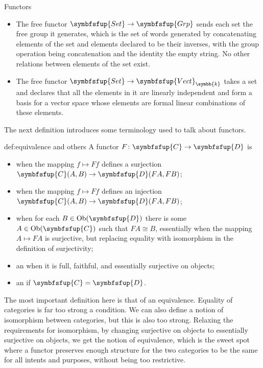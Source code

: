 \documentclass[fleqn]{NotesClass}
\makeatletter
\newcommand{\cat}[1]{\symbfsfup{#1}}
\newcommand{\c@egory}[1]{\symbfsfup{#1}}
\newcommand{\Set}{\c@egory{Set}}
\renewcommand{\field}{\symbb{k}}
\newcommand{\Vect}[1][\field]{{\c@egory{Vect}_{#1}}}
\newcommand{\Grp}{\c@egory{Grp}}
\DeclareMathOperator{\Ob}{Ob}
\newcommand{\isomorphic}{\cong}
\makeatother
\begin{document}
\begin{exm}{Functors}{}
\begin{itemize}
            \begin{itemize}
                \item The free functor \(\Set \to \Grp\) sends each set the free group it generates, which is the set of words generated by concatenating elements of the set and elements declared to be their inverses, with the group operation being concatenation and the identity the empty string.
                No other relations between elements of the set exist.
                \item The free functor \(\Set \to \Vect\) takes a set and declares that all the elements in it are linearly independent and form a basis for a vector space whose elements are formal linear combinations of these elements.
            \end{itemize}
        \end{itemize}
    \end{exm}
    
    The next definition introduces some terminology used to talk about functors.
    
    \begin{dfn}{}{def:equivalence and others}
        A functor \(F \colon \cat{C} \to \cat{D}\) is
        \begin{itemize}
            \item {} when the mapping \(f \mapsto Ff\) defines a surjection \(\cat{C}(A, B) \to \cat{D}(FA, FB)\);
            \item {} when the mapping \(f \mapsto Ff\) defines an injection \(\cat{C}(A, B) \to \cat{D}(FA, FB)\);
            \item {} when for each \(B \in \Ob(\cat{D})\) there is some \(A \in \Ob(\cat{C})\) such that \(FA \isomorphic B\), essentially when the mapping \(A \mapsto FA\) is surjective, but replacing equality with isomorphism in the definition of surjectivity;
            \item an  when it is full, faithful, and essentially surjective on objects;
            \item an  if \(\cat{C} = \cat{D}\).
        \end{itemize}
    \end{dfn}
    
    The most important definition here is that of an equivalence.
    Equality of categories is far too strong a condition.
    We can also define a notion of isomorphism between categories, but this is also too strong.
    Relaxing the requirements for isomorphism, by changing surjective on objects to essentially surjective on objects, we get the notion of equivalence, which is the sweet spot where a functor preserves enough structure for the two categories to be the same for all intents and purposes, without being too restrictive.
    
\end{document}
